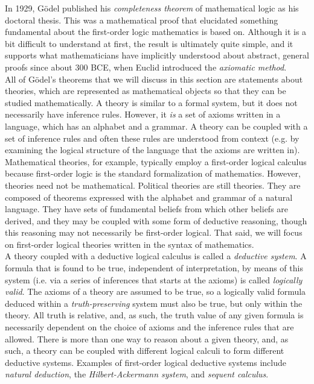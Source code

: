 In 1929, G\"odel published his \textit{completeness theorem} of mathematical logic as his doctoral thesis. This was a mathematical proof that elucidated something fundamental about the first-order logic mathematics is based on. Although it is a bit difficult to understand at first, the result is ultimately quite simple, and it supports what mathematicians have implicitly understood about abstract, general proofs since about 300 \textsc{BCE}, when Euclid introduced the \textit{axiomatic method}. \\


All of G\"odel's theorems that we will discuss in this section are statements about theories, which are represented as mathematical objects so that they can be studied mathematically. A theory is similar to a formal system, but it does not necessarily have inference rules. However, it \textit{is} a set of axioms written in a language, which has an alphabet and a grammar. A theory can be coupled with a set of inference rules and often these rules are understood from context (e.g. by examining the logical structure of the language that the axioms are written in). Mathematical theories, for example, typically employ a first-order logical calculus because first-order logic is the standard formalization of mathematics. However, theories need not be mathematical. Political theories are still theories. They are composed of theorems expressed with the alphabet and grammar of a natural language. They have sets of fundamental beliefs from which other beliefs are derived, and they may be coupled with some form of deductive reasoning, though this reasoning may not necessarily be first-order logical. That said, we will focus on first-order logical theories written in the syntax of mathematics. \\

A theory coupled with a deductive logical calculus is called a \textit{deductive system}. A formula that is found to be true, independent of interpretation, by means of this system (i.e. via a series of inferences that starts at the axioms) is called \textit{logically valid}. The axioms of a theory are assumed to be true, so a logically valid formula deduced within a \textit{truth-preserving} system must also be true, but only within the theory. All truth is relative, and, as such, the truth value of any given formula is necessarily dependent on the choice of axioms and the inference rules that are allowed. There is more than one way to reason about a given theory, and, as such, a theory can be coupled with different logical calculi to form different deductive systems. Examples of first-order logical deductive systems include \textit{natural deduction}, the \textit{Hilbert-Ackermann system}, and \textit{sequent calculus}. \\

